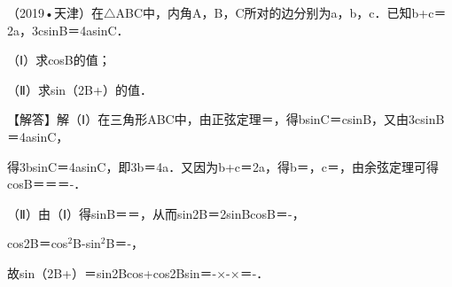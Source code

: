 \begin{question}
（2019•天津）在$\triangle$ABC中，内角A，B，C所对的边分别为a，b，c．已知b+c＝2a，3csinB＝4asinC．\par
（Ⅰ）求cosB的值；\par
（Ⅱ）求sin（2B+\allowbreak{}）的值．\par
\begin{solution}
【解答】解（Ⅰ）在三角形ABC中，由正弦定理\allowbreak{}＝\allowbreak{}，得bsinC＝csinB，又由3csinB＝4asinC，\par
得3bsinC＝4asinC，即3b＝4a．又因为b+c＝2a，得b＝\allowbreak{}，c＝\allowbreak{}，由余弦定理可得cosB＝\allowbreak{}＝\allowbreak{}＝-\allowbreak{}．\par
（Ⅱ）由（Ⅰ）得sinB＝\allowbreak{}＝\allowbreak{}，从而sin2B＝2sinBcosB＝-\allowbreak{}，\par
cos2B＝cos$^{2}$B-sin$^{2}$B＝-\allowbreak{}，\par
故sin（2B+\allowbreak{}）＝sin2Bcos\allowbreak{}+cos2Bsin\allowbreak{}＝-\allowbreak{}×\allowbreak{}-\allowbreak{}×\allowbreak{}＝-\allowbreak{}．\par
\end{solution}
\end{question}

